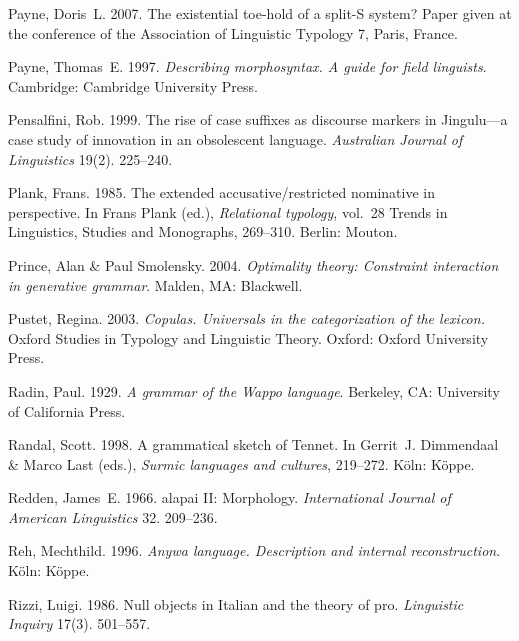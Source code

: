 \documentclass[ number=1
			   ,series=sidl
				,url=http://langsci-press.org/catalog/book/18 
			   ,isbn=978-3-944675-19-0
			   ,output=long   %
			  ]{LSP/langsci}
\begin{document}
\begin{thebibliography}{190}
Payne, Doris~L. 2007.
\newblock The existential toe-hold of a split-{S} system?
\newblock Paper given at the conference of the {A}ssociation of {L}inguistic
  {T}ypology 7, Paris, France.

Payne, Thomas~E. 1997.
\newblock \emph{Describing morphosyntax. {A} guide for field linguists}.
\newblock Cambridge: Cambridge University Press.

Pensalfini, Rob. 1999.
\newblock The rise of case suffixes as discourse markers in {J}ingulu---a case
  study of innovation in an obsolescent language.
\newblock \emph{Australian Journal of Linguistics} 19(2). 225--240.
\enlargethispage{2\baselineskip}

Plank, Frans. 1985.
\newblock The extended accusative/restricted nominative in perspective.
\newblock In Frans Plank (ed.), \emph{Relational typology}, vol.~28 Trends in
  Linguistics, Studies and Monographs, 269--310. Berlin: Mouton.

Prince, Alan \& Paul Smolensky. 2004.
\newblock \emph{Optimality theory: {C}onstraint interaction in generative
  grammar}.
\newblock Malden, MA: Blackwell.

Pustet, Regina. 2003.
\newblock \emph{Copulas. {U}niversals in the categorization of the lexicon.}
  Oxford Studies in Typology and Linguistic Theory.
\newblock Oxford: Oxford University Press.

Radin, Paul. 1929.
\newblock \emph{A grammar of the {W}appo language}.
\newblock Berkeley, CA: University of California Press.

Randal, Scott. 1998.
\newblock A grammatical sketch of {T}ennet.
\newblock In Gerrit~J. Dimmendaal \& Marco Last (eds.), \emph{Surmic languages
  and cultures}, 219--272. K{\"o}ln: K{\"o}ppe.

Redden, James~E. 1966.
alapai {II}: {M}orphology.
\newblock \emph{International Journal of American Linguistics} 32. 209--236.

Reh, Mechthild. 1996.
\newblock \emph{{A}nywa language. {D}escription and internal reconstruction}.
\newblock K{\"o}ln: K{\"o}ppe.

Rizzi, Luigi. 1986.
\newblock Null objects in {I}talian and the theory of pro.
\newblock \emph{Linguistic Inquiry} 17(3). 501--557.


\end{thebibliography}
\end{document}
